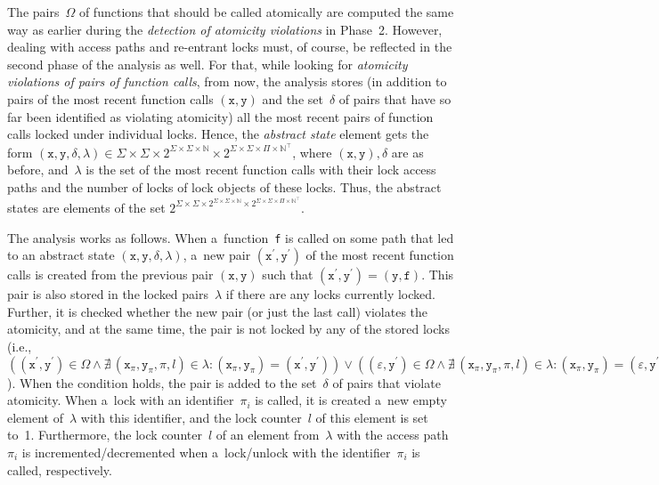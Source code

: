 The pairs~$ \Omega $ of functions that should be called atomically are computed the same way as earlier during the \emph{detection of atomicity violations} in Phase~2. However, dealing with access paths and re-entrant locks must, of course, be reflected in the second phase of the analysis as well. For that, while looking for \emph{atomicity violations of pairs of function calls}, from now, the analysis stores (in addition to pairs of the most recent function calls $ (\mathtt{x, y}) $ and the set~$ \delta $ of pairs that have so far been identified as violating atomicity) all the most recent pairs of function calls locked under individual locks. Hence, the \emph{abstract state} element gets the form $ (\mathtt{x}, \mathtt{y}, \delta, \lambda) \in \Sigma \times \Sigma \times 2^{\Sigma \times \Sigma \times \mathbb{N}} \times 2^{\Sigma \times \Sigma \times \Pi \times \mathbb{N}^\top} $, where $ (\mathtt{x, y}), \delta $ are as before, and~$ \lambda $ is the set of the most recent function calls with their lock access paths and the number of locks of lock objects of these locks. Thus, the abstract states are elements of the set $ 2^{\Sigma \times \Sigma \times 2^{\Sigma \times \Sigma \times \mathbb{N}} \times 2^{\Sigma \times \Sigma \times \Pi \times \mathbb{N}^\top}} $.

The analysis works as follows. When a~function~\texttt{f} is called on some path that led to an abstract state $ (\mathtt{x}, \mathtt{y}, \delta, \lambda) $, a~new pair $ (\mathtt{x}^\prime, \mathtt{y}^\prime) $ of the most recent function calls is created from the previous pair $ (\mathtt{x}, \mathtt{y}) $ such that $ (\mathtt{x}^\prime, \mathtt{y}^\prime) = (\mathtt{y}, \mathtt{f}) $. This pair is also stored in the locked pairs~$ \lambda $ if there are any locks currently locked. Further, it is checked whether the new pair (or just the last call) violates the atomicity, and at the same time, the pair is not locked by any of the stored locks (i.e., $ ((\mathtt{x}^\prime, \mathtt{y}^\prime) \in \Omega \wedge \nexists\,(\mathtt{x}_\pi, \mathtt{y}_\pi, \pi, l) \in \lambda : (\mathtt{x}_\pi, \mathtt{y}_\pi) = (\mathtt{x}^\prime, \mathtt{y}^\prime)) \vee ((\varepsilon, \mathtt{y}^\prime) \in \Omega \wedge \nexists\,(\mathtt{x}_\pi, \mathtt{y}_\pi, \pi, l) \in \lambda : (\mathtt{x}_\pi, \mathtt{y}_\pi) = (\varepsilon, \mathtt{y}^\prime)) $). When the condition holds, the pair is added to the set~$ \delta $ of pairs that violate atomicity. When a~lock with an identifier~$ \pi_i $ is called, it is created a~new empty element of~$ \lambda $ with this identifier, and the lock counter~$ l $ of this element is set to~1. Furthermore, the lock counter~$ l $ of an element from~$ \lambda $ with the access path~$ \pi_i $ is incremented/decremented when a~lock/unlock with the identifier~$ \pi_i $ is called, respectively.

